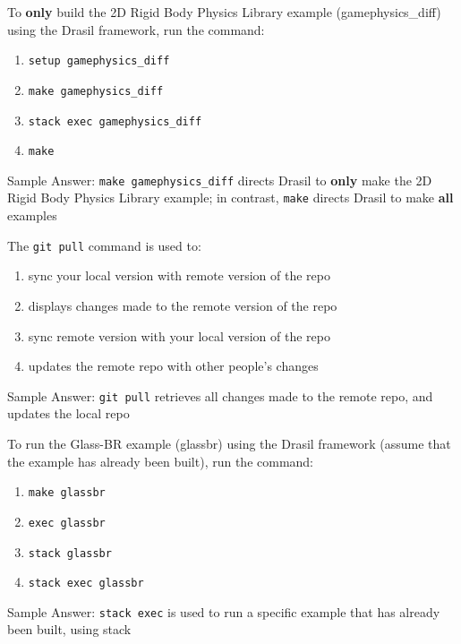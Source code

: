 \documentclass[12pt,fleqn]{examtst}
\begin{document}

\newpage
\noindent
\begin{minipage}{\textwidth}

To \textbf{only} build the 2D Rigid Body Physics Library example (gamephysics\_diff) using the Drasil framework, run the command:

\begin{enumerate}
    \item \lstinline{setup gamephysics_diff}
    \item \lstinline{make gamephysics_diff} \marker
    \item \lstinline{stack exec gamephysics_diff}
    \item \lstinline{make}
\end{enumerate}
Sample Answer: \lstinline{make gamephysics_diff} directs Drasil to \textbf{only} make the 2D Rigid Body Physics Library example; in contrast,  \lstinline{make} directs Drasil to make \textbf{all} examples

The \lstinline{git pull} command is used to:

\begin{enumerate}
    \item sync your local version with remote version of the repo \marker
    \item displays changes made to the remote version of the repo
    \item sync remote version with your local version of the repo
    \item updates the remote repo with other people's changes
\end{enumerate}
Sample Answer: \lstinline{git pull} retrieves all changes made to the remote repo, and updates the local repo

To run the Glass-BR example (glassbr) using the Drasil framework (assume that the example has already been built), run the command:

\begin{enumerate}
    \item \lstinline{make glassbr}
    \item \lstinline{exec glassbr}
    \item \lstinline{stack glassbr}
    \item \lstinline{stack exec glassbr} \marker
\end{enumerate}
Sample Answer: \lstinline{stack exec} is used to run a specific example that has already been built, using stack

\end{minipage}
\end{document}
